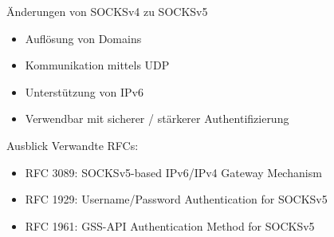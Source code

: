 \documentclass[t]{beamer}
\begin{document}
  \begin{frame}{Änderungen von SOCKSv4 zu SOCKSv5}
    \begin{itemize}
      \item Auflösung von Domains
      \item Kommunikation mittels UDP
      \item Unterstützung von IPv6
      \item Verwendbar mit sicherer / stärkerer Authentifizierung
    \end{itemize}
  \end{frame}

  \begin{frame}{Ausblick}
    Verwandte RFCs:

    \begin{itemize}
      \item RFC 3089: SOCKSv5-based IPv6/IPv4 Gateway Mechanism
      \item RFC 1929: Username/Password Authentication for SOCKSv5
      \item RFC 1961: GSS-API Authentication Method for SOCKSv5
    \end{itemize}
  \end{frame}
\end{document}

